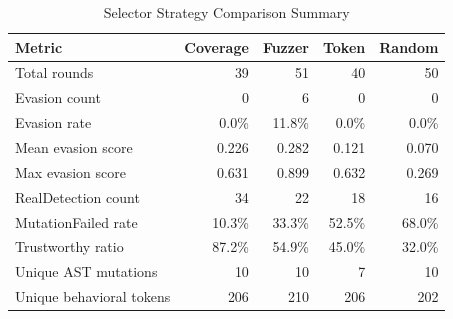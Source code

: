 \begin{table}[htbp]
\centering
\caption{Selector Strategy Comparison Summary}
\label{tab:selector-comparison}
\begin{tabular}{lrrrr}
\toprule
Metric & Coverage & Fuzzer & Token & Random \\
\midrule
Total rounds & 39 & 51 & 40 & 50 \\
Evasion count & 0 & 6 & 0 & 0 \\
Evasion rate & 0.0\% & 11.8\% & 0.0\% & 0.0\% \\
Mean evasion score & 0.226 & 0.282 & 0.121 & 0.070 \\
Max evasion score & 0.631 & 0.899 & 0.632 & 0.269 \\
RealDetection count & 34 & 22 & 18 & 16 \\
MutationFailed rate & 10.3\% & 33.3\% & 52.5\% & 68.0\% \\
Trustworthy ratio & 87.2\% & 54.9\% & 45.0\% & 32.0\% \\
Unique AST mutations & 10 & 10 & 7 & 10 \\
Unique behavioral tokens & 206 & 210 & 206 & 202 \\
\bottomrule
\end{tabular}
\end{table}
